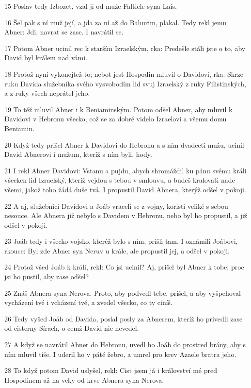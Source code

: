 \par 15 Poslav tedy Izbozet, vzal ji od muže Faltiele syna Lais.
\par 16 Šel pak s ní muž její, a jda za ní až do Bahurim, plakal. Tedy rekl jemu Abner: Jdi, navrat se zase. I navrátil se.
\par 17 Potom Abner ucinil rec k starším Izraelským, rka: Predešle stáli jste o to, aby David byl králem nad vámi.
\par 18 Protož nyní vykonejtež to; nebot jest Hospodin mluvil o Davidovi, rka: Skrze ruku Davida služebníka svého vysvobodím lid svuj Izraelský z ruky Filistinských, a z ruky všech neprátel jeho.
\par 19 To též mluvil Abner i k Beniaminským. Potom odšel Abner, aby mluvil k Davidovi v Hebronu všecko, což se za dobré videlo Izraelovi a všemu domu Beniamin.
\par 20 Když tedy prišel Abner k Davidovi do Hebronu a s ním dvadceti mužu, ucinil David Abnerovi i mužum, kteríž s ním byli, hody.
\par 21 I rekl Abner Davidovi: Vstanu a pujdu, abych shromáždil ku pánu svému králi všecken lid Izraelský, kteríž vejdou s tebou v smlouvu, a budeš kralovati nade všemi, jakož toho žádá duše tvá. I propustil David Abnera, kterýž odšel v pokoji.
\par 22 A aj, služebníci Davidovi a Joáb vraceli se z vojny, koristi veliké s sebou nesouce. Ale Abnera již nebylo s Davidem v Hebronu, nebo byl ho propustil, a již odšel v pokoji.
\par 23 Joáb tedy i všecko vojsko, kteréž bylo s ním, prišli tam. I oznámili Joábovi, rkouce: Byl zde Abner syn Neruv u krále, ale propustil jej, a odšel v pokoji.
\par 24 Protož všed Joáb k králi, rekl: Co jsi ucinil? Aj, prišel byl Abner k tobe; proc jsi ho pustil, aby zase odšel?
\par 25 Znáš Abnera syna Nerova. Proto, aby podvedl tebe, prišel, a aby vyšpehoval vycházení tvé i vcházení tvé, a zvedel všecko, co ty ciníš.
\par 26 Tedy vyšed Joáb od Davida, poslal posly za Abnerem, kteríž ho privedli zase od cisterny Sírach, o cemž David nic nevedel.
\par 27 A když se navrátil Abner do Hebronu, uvedl ho Joáb do prostred brány, aby s ním mluvil tiše. I uderil ho v páté žebro, a umrel pro krev Azaele bratra jeho.
\par 28 To když potom David uslyšel, rekl: Cist jsem já i království mé pred Hospodinem až na veky od krve Abnera syna Nerova.
